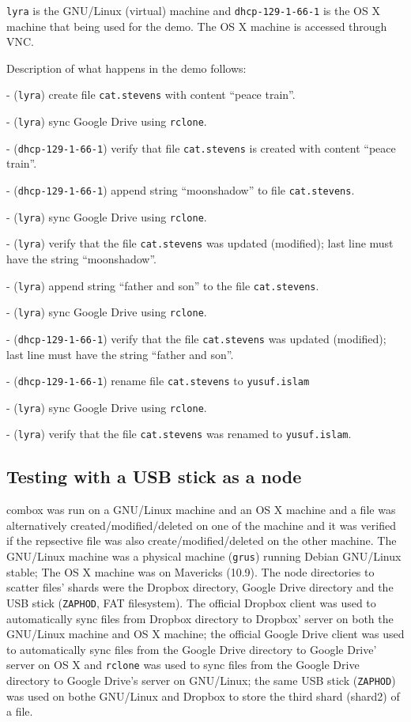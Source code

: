 \verb+lyra+ is the GNU/Linux (virtual) machine and
\verb+dhcp-129-1-66-1+ is the OS X machine that being used for the
demo. The OS X machine is accessed through VNC\cite{article:vnc}.

Description of what happens in the demo follows:

  - (\verb+lyra+) create file \verb+cat.stevens+ with content ``peace train''.

  - (\verb+lyra+) sync Google Drive using \verb+rclone+.

  - (\verb+dhcp-129-1-66-1+) verify that file \verb+cat.stevens+ is
  created with content ``peace train''.

  - (\verb+dhcp-129-1-66-1+) append string ``moonshadow'' to file
  \verb+cat.stevens+.

  - (\verb+lyra+) sync Google Drive using \verb+rclone+.

  - (\verb+lyra+) verify that the file \verb+cat.stevens+ was updated
  (modified); last line must have the string ``moonshadow''.

  - (\verb+lyra+) append string ``father and son'' to the file
  \verb+cat.stevens+.

  - (\verb+lyra+) sync Google Drive using \verb+rclone+.

  - (\verb+dhcp-129-1-66-1+) verify that the file \verb+cat.stevens+
  was updated (modified); last line must have the string ``father and
  son''.

  - (\verb+dhcp-129-1-66-1+) rename file \verb+cat.stevens+ to
  \verb+yusuf.islam+

  - (\verb+lyra+) sync Google Drive using \verb+rclone+.

  - (\verb+lyra+) verify that the file \verb+cat.stevens+ was renamed
  to \verb+yusuf.islam+.

\subsection{Testing with a USB stick as a node}

combox was run on a GNU/Linux machine and an OS X machine and a file
was alternatively created/modified/deleted on one of the machine and
it was verified if the repsective file was also
create/modified/deleted on the other machine. The GNU/Linux machine
was a physical machine (\verb+grus+) running Debian GNU/Linux stable;
The OS X machine was on Mavericks (10.9). The node directories to
scatter files' shards were the Dropbox directory, Google Drive
directory and the USB stick (\verb+ZAPHOD+, FAT filesystem). The
official Dropbox client was used to automatically sync files from
Dropbox directory to Dropbox' server on both the GNU/Linux machine and
OS X machine; the official Google Drive client was used to
automatically sync files from the Google Drive directory to Google
Drive' server on OS X and \verb+rclone+\cite{program:rclone} was used
to sync files from the Google Drive directory to Google Drive's server
on GNU/Linux; the same USB stick (\verb+ZAPHOD+) was used on bothe
GNU/Linux and Dropbox to store the third shard (shard2) of a file.

